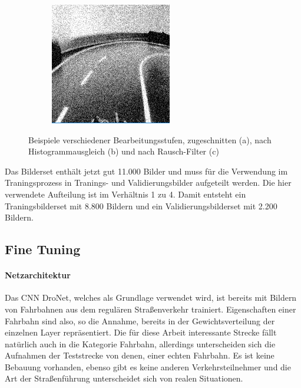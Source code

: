 \begin{figure}[h]
\begin{subfigure}{.33\textwidth}
	 	  \caption{}
		  \label{fig:imageb}
	\end{subfigure}%
	\begin{subfigure}{.33\textwidth}
	\centering
		  \includegraphics[width=0.9\linewidth]{figures/200x200Gauss.png}
	 	  \caption{}
		  \label{fig:imagec}
	\end{subfigure}%
	\caption{Beispiele verschiedener Bearbeitungsstufen, zugeschnitten (a), nach Histogrammausgleich (b) und nach Rausch-Filter (c) }
	\label{fig:pipelineexample}
\end{figure}%

Das Bilderset enthält jetzt gut 11.000 Bilder und muss für die Verwendung im Traningsprozess in Tranings- und Validierungsbilder aufgeteilt werden. Die hier verwendete Aufteilung ist im Verhältnis 1 zu 4. Damit entsteht ein Traningsbilderset mit 8.800 Bildern und ein Validierungsbilderset mit 2.200 Bildern.


\subsection{Fine Tuning}

\paragraph{Netzarchitektur}
Das CNN DroNet, welches als Grundlage verwendet wird, ist bereits mit Bildern von Fahrbahnen aus dem regulären Straßenverkehr trainiert. Eigenschaften einer Fahrbahn sind also, so die Annahme, bereits in der Gewichtsverteilung der einzelnen Layer repräsentiert. Die für diese Arbeit interessante Strecke fällt natürlich auch in die Kategorie Fahrbahn, allerdings unterscheiden sich die Aufnahmen der Teststrecke von denen, einer echten Fahrbahn. Es ist keine Bebauung vorhanden, ebenso gibt es keine anderen Verkehrsteilnehmer und die Art der Straßenführung unterscheidet sich von realen Situationen.

